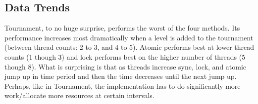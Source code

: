 \documentclass{article}
\begin{document}
\subsection{Data Trends}
Tournament, to no huge surprise, performs the worst of the four methods. Its performance increases most dramatically when a level is added to the tournament (between thread counts: 2 to 3, and 4 to 5). Atomic performs best at lower thread counts (1 though 3) and lock performs best on the higher number of threads (5 though 8). What is surprising is that as threads increase sync, lock, and atomic jump up in time period and then the time decreases until the next jump up. Perhaps, like in Tournament, the implementation has to do significantly more work/allocate more resources at certain intervals.  
\end{document}
